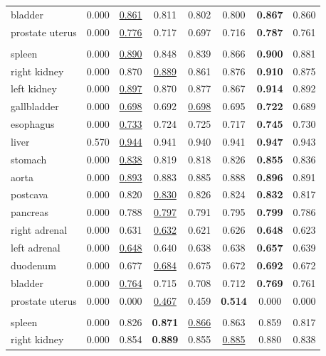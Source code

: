 \begin{minipage}{\textwidth}
{\begin{tabular}{@{}lccccccc@{}}
bladder & 0.000 & \underline{0.861} & 0.811 & 0.802 & 0.800 & \textbf{0.867} & 0.860 \\
prostate uterus & 0.000 & \underline{0.776} & 0.717 & 0.697 & 0.716 & \textbf{0.787} & 0.761 \\
\addlinespace
\multicolumn{8}{@{}l}{\textit{joint}} \\
spleen & 0.000 & \underline{0.890} & 0.848 & 0.839 & 0.866 & \textbf{0.900} & 0.881 \\
right kidney & 0.000 & 0.870 & \underline{0.889} & 0.861 & 0.876 & \textbf{0.910} & 0.875 \\
left kidney & 0.000 & \underline{0.897} & 0.870 & 0.877 & 0.867 & \textbf{0.914} & 0.892 \\
gallbladder & 0.000 & \underline{0.698} & 0.692 & \underline{0.698} & 0.695 & \textbf{0.722} & 0.689 \\
esophagus & 0.000 & \underline{0.733} & 0.724 & 0.725 & 0.717 & \textbf{0.745} & 0.730 \\
liver & 0.570 & \underline{0.944} & 0.941 & 0.940 & 0.941 & \textbf{0.947} & 0.943 \\
stomach & 0.000 & \underline{0.838} & 0.819 & 0.818 & 0.826 & \textbf{0.855} & 0.836 \\
aorta & 0.000 & \underline{0.893} & 0.883 & 0.885 & 0.888 & \textbf{0.896} & 0.891 \\
postcava & 0.000 & 0.820 & \underline{0.830} & 0.826 & 0.824 & \textbf{0.832} & 0.817 \\
pancreas & 0.000 & 0.788 & \underline{0.797} & 0.791 & 0.795 & \textbf{0.799} & 0.786 \\
right adrenal & 0.000 & 0.631 & \underline{0.632} & 0.621 & 0.626 & \textbf{0.648} & 0.623 \\
left adrenal & 0.000 & \underline{0.648} & 0.640 & 0.638 & 0.638 & \textbf{0.657} & 0.639 \\
duodenum & 0.000 & 0.677 & \underline{0.684} & 0.675 & 0.672 & \textbf{0.692} & 0.672 \\
bladder & 0.000 & \underline{0.764} & 0.715 & 0.708 & 0.712 & \textbf{0.769} & 0.761 \\
prostate uterus & 0.000 & 0.000 & \underline{0.467} & 0.459 & \textbf{0.514} & 0.000 & 0.000 \\
\addlinespace
\multicolumn{8}{@{}l}{\textit{joint (8000 steps)}} \\
spleen & 0.000 & 0.826 & \textbf{0.871} & \underline{0.866} & 0.863 & 0.859 & 0.817 \\
right kidney & 0.000 & 0.854 & \textbf{0.889} & 0.855 & \underline{0.885} & 0.880 & 0.838 \\

\end{tabular}}
\end{minipage}

